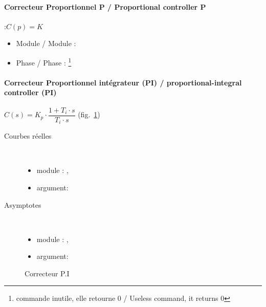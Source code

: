 \documentclass[a4paper,12pt]{article}                      %
\newcommand{\TradEnLigne}[2]{
#1 / {\color{blue}#2}
}
\begin{document}
\paragraph{\TradEnLigne{Correcteur Proportionnel  P}{Proportional controller P}} :$C(p)=K$
\begin{itemize}
\item \TradEnLigne{Module}{Module} :  
\item \TradEnLigne{Phase}{Phase} :  \footnote{\TradEnLigne{commande inutile, elle retourne 0}{Useless command, it returns 0}}

\end{itemize}

\paragraph{\TradEnLigne{Correcteur Proportionnel intégrateur (PI)}{proportional-integral controller (PI)}}

 $C(s)=K_p\cdot\dfrac{1+T_i\cdot s}{T_i\cdot s}$ (fig.~\ref{fig:corpi})

\begin{multicols}{2}
\begin{description}
\item[Courbes réelles]~\\
\begin{itemize}
\item module :  , 
\item argument:  
\end{itemize}

\item[Asymptotes]~\\

\begin{itemize}
\item module :  , 
\item argument:  
\end{itemize}
\end{description}

\end{multicols}



\begin{figure}[!ht]
\centering
\begin{tikzexample}[title=,righthand width=0.55\textwidth,] 
\end{tikzexample}
\caption{Correcteur P.I}
\label{fig:corpi}
\end{figure}
\end{document}
